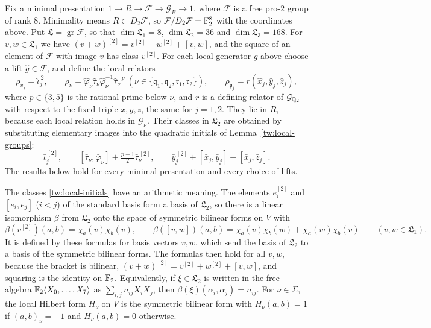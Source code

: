 Fix a minimal presentation $1\to R\to\mathcal F\to\mathcal G_B\to1$, where
$\mathcal F$ is a free pro-$2$ group of rank $8$. Minimality means
$R\subset D_2\mathcal F$, so $\mathcal F/D_2\mathcal F=\mathbb F_2^8$ with the
coordinates above. Put $\mathfrak L=\operatorname{gr}\mathcal F$, so that
$\dim\mathfrak L_1=8$, $\dim\mathfrak L_2=36$ and $\dim\mathfrak L_3=168$.
For $v,w\in\mathfrak L_1$ we have $(v+w)^{[2]}=v^{[2]}+w^{[2]}+[v,w]$, and the
square of an element of $\mathcal F$ with image $v$ has class $v^{[2]}$. For
each local generator $g$ above choose a lift $\hat g\in\mathcal F$, and define
the local relators
\begin{equation}\label{tw:relators}
 \rho_{v_j}=\hat\iota_j^{\,2},\qquad
 \rho_\nu=\hat\varphi_\nu\hat\tau_\nu\hat\varphi_\nu^{-1}\hat\tau_\nu^{-p}
 \ (\nu\in\{\mathfrak q_1,\mathfrak q_2,\mathfrak r_1,\mathfrak r_2\}),\qquad
 \rho_{\mathfrak p_j}=r(\hat x_j,\hat y_j,\hat z_j),
\end{equation}
where $p\in\{3,5\}$ is the rational prime below $\nu$, and $r$ is a
defining relator of $\mathcal G_{\mathbb Q_2}$ with respect to the fixed triple
$x,y,z$, the same for $j=1,2$. They lie in $R$, because each local relation
holds in $\mathcal G_\nu$. Their classes in $\mathfrak L_2$ are obtained by
substituting elementary images into the quadratic initials of
Lemma~\ref{tw:local-groups}:
\begin{equation}\label{tw:local-initials}
 \bar\iota_j^{\,[2]},\qquad
 [\bar\tau_\nu,\bar\varphi_\nu]+\tfrac{p-1}2\bar\tau_\nu^{\,[2]},\qquad
 \bar y_j^{\,[2]}+[\bar x_j,\bar y_j]+[\bar x_j,\bar z_j].
\end{equation}
The results below hold for every minimal presentation and every choice of
lifts.

The classes \eqref{tw:local-initials} have an arithmetic meaning. The
elements $e_i^{[2]}$ and $[e_i,e_j]$ ($i<j$) of the standard basis form a
basis of $\mathfrak L_2$, so there is a linear isomorphism $\beta$ from
$\mathfrak L_2$ onto the space of symmetric bilinear forms on $V$ with
\[
 \beta(v^{[2]})(a,b)=\chi_a(v)\chi_b(v),\qquad
 \beta([v,w])(a,b)=\chi_a(v)\chi_b(w)+\chi_a(w)\chi_b(v)
 \qquad(v,w\in\mathfrak L_1).
\]
It is defined by these formulas for basis vectors $v,w$, which send the basis
of $\mathfrak L_2$ to a basis of the symmetric bilinear forms. The formulas
then hold for all $v,w$, because the bracket is bilinear,
$(v+w)^{[2]}=v^{[2]}+w^{[2]}+[v,w]$, and squaring is the identity on $\mathbb F_2$.
Equivalently, if $\xi\in\mathfrak L_2$ is written in the free algebra
$\mathbb F_2\langle X_0,\dots,X_7\rangle$ as $\sum_{i,j}n_{ij}X_iX_j$, then
$\beta(\xi)(\alpha_i,\alpha_j)=n_{ij}$.
For $\nu\in\Sigma$, the local Hilbert form $H_\nu$ on $V$ is the symmetric
bilinear form with $H_\nu(a,b)=1$ if $(a,b)_\nu=-1$ and $H_\nu(a,b)=0$
otherwise.

